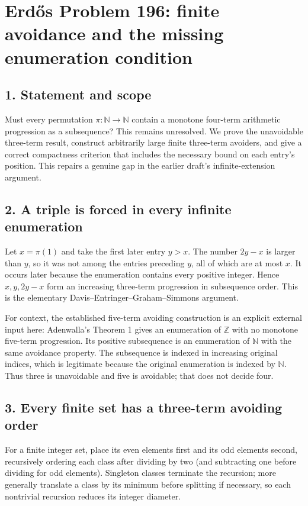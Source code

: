 \section*{Erd\H{o}s Problem 196: finite avoidance and the missing enumeration condition}

\subsection*{1. Statement and scope}
Must every permutation $\pi:\mathbb N\to\mathbb N$ contain a monotone four-term arithmetic progression as a subsequence? This remains unresolved. We prove the unavoidable three-term result, construct arbitrarily large finite three-term avoiders, and give a correct compactness criterion that includes the necessary bound on each entry's position. This repairs a genuine gap in the earlier draft's infinite-extension argument.

\subsection*{2. A triple is forced in every infinite enumeration}
Let $x=\pi(1)$ and take the first later entry $y>x$. The number $2y-x$ is larger than $y$, so it was not among the entries preceding $y$, all of which are at most $x$. It occurs later because the enumeration contains every positive integer. Hence $x,y,2y-x$ form an increasing three-term progression in subsequence order. This is the elementary Davis--Entringer--Graham--Simmons argument.

For context, the established five-term avoiding construction is an explicit external input here: Adenwalla's Theorem 1 gives an enumeration of $\mathbb Z$ with no monotone five-term progression. Its positive subsequence is an enumeration of $\mathbb N$ with the same avoidance property. The subsequence is indexed in increasing original indices, which is legitimate because the original enumeration is indexed by $\mathbb N$. Thus three is unavoidable and five is avoidable; that does not decide four.

\subsection*{3. Every finite set has a three-term avoiding order}
For a finite integer set, place its even elements first and its odd elements second, recursively ordering each class after dividing by two (and subtracting one before dividing for odd elements). Singleton classes terminate the recursion; more generally translate a class by its minimum before splitting if necessary, so each nontrivial recursion reduces its integer diameter.

